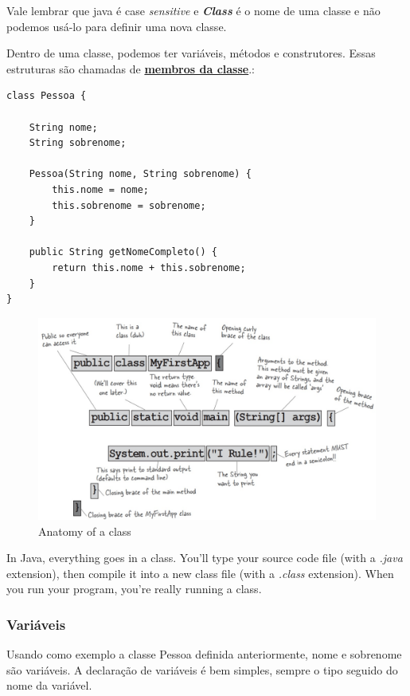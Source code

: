 \documentclass[12pt]{article}
\begin{document}
Vale lembrar que java é case \textit{sensitive} e \textbf{\textit{Class}} é o nome de uma classe e não podemos usá-lo para definir uma nova classe.

Dentro de uma classe, podemos ter variáveis, métodos e construtores. Essas estruturas são chamadas de \underline{\textbf{membros da classe}}.:

\begin{lstlisting}
class Pessoa {
	
	String nome;
	String sobrenome;
	
	Pessoa(String nome, String sobrenome) {
		this.nome = nome;
		this.sobrenome = sobrenome;
	}
	
	public String getNomeCompleto() {
		return this.nome + this.sobrenome;
	}
}	
\end{lstlisting}

\begin{figure}[H]
	\centering
	\includegraphics[width=1\linewidth]{figuras/class}
	\caption[Anatomy of a class]{Anatomy of a class}
	\label{fig:class}
\end{figure}

In Java, everything goes in a class. You’ll type your source code file (with a \textit{.java} extension), then compile it into a new class file (with a \textit{.class} extension). When you run your program, you’re really running a class.


\subsubsection{Variáveis}

Usando como exemplo a classe Pessoa definida anteriormente, nome e sobrenome são variáveis. A declaração de variáveis é bem simples, sempre o tipo seguido do nome da variável.
\end{document}
